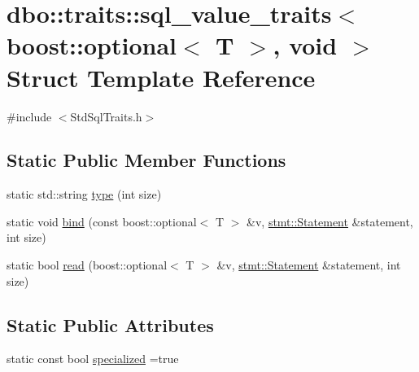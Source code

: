\hypertarget{structdbo_1_1traits_1_1sql__value__traits_3_01boost_1_1optional_3_01_t_01_4_00_01void_01_4}{\section{dbo\+:\+:traits\+:\+:sql\+\_\+value\+\_\+traits$<$ boost\+:\+:optional$<$ T $>$, void $>$ Struct Template Reference}
\label{structdbo_1_1traits_1_1sql__value__traits_3_01boost_1_1optional_3_01_t_01_4_00_01void_01_4}
}


{\ttfamily \#include $<$Std\+Sql\+Traits.\+h$>$}

\subsection*{Static Public Member Functions}
\begin{DoxyCompactItemize}
\item 
static std\+::string \hyperlink{structdbo_1_1traits_1_1sql__value__traits_3_01boost_1_1optional_3_01_t_01_4_00_01void_01_4_aa8ae1461ca32305d69c1b3a7f1333655}{type} (int size)
\item 
static void \hyperlink{structdbo_1_1traits_1_1sql__value__traits_3_01boost_1_1optional_3_01_t_01_4_00_01void_01_4_ac6a67ea811b6c047782b43111b8eb769}{bind} (const boost\+::optional$<$ T $>$ \&v, \hyperlink{classdbo_1_1stmt_1_1_statement}{stmt\+::\+Statement} \&statement, int size)
\item 
static bool \hyperlink{structdbo_1_1traits_1_1sql__value__traits_3_01boost_1_1optional_3_01_t_01_4_00_01void_01_4_a2707d5f4835004396b68f9580c6f6929}{read} (boost\+::optional$<$ T $>$ \&v, \hyperlink{classdbo_1_1stmt_1_1_statement}{stmt\+::\+Statement} \&statement, int size)
\end{DoxyCompactItemize}
\subsection*{Static Public Attributes}
\begin{DoxyCompactItemize}
\item 
static const bool \hyperlink{structdbo_1_1traits_1_1sql__value__traits_3_01boost_1_1optional_3_01_t_01_4_00_01void_01_4_a3268f227f24570a7007bbf99d200c03e}{specialized} =true
\end{DoxyCompactItemize}


